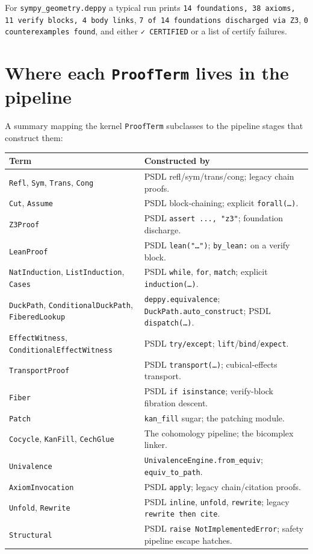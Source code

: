 For \texttt{sympy\_geometry.deppy} a typical run prints
\texttt{14 foundations, 38 axioms, 11 verify blocks, 4 body links},
\texttt{7 of 14 foundations discharged via Z3}, \texttt{0
counterexamples found}, and either \texttt{✓ CERTIFIED} or a list
of certify failures.

\section{Where each \texttt{ProofTerm} lives in the pipeline}

A summary mapping the kernel \texttt{ProofTerm} subclasses to the
pipeline stages that construct them:

\begin{center}
\begin{tabularx}{\linewidth}{@{}lX@{}}
\toprule
\textbf{Term} & \textbf{Constructed by} \\
\midrule
\texttt{Refl}, \texttt{Sym}, \texttt{Trans}, \texttt{Cong} &
PSDL refl/sym/trans/cong; legacy chain proofs. \\
\texttt{Cut}, \texttt{Assume} &
PSDL block-chaining; explicit \texttt{forall(\dots)}. \\
\texttt{Z3Proof} &
PSDL \texttt{assert ..., "z3"}; foundation discharge. \\
\texttt{LeanProof} &
PSDL \texttt{lean("\dots")}; \texttt{by\_lean:} on a verify block. \\
\texttt{NatInduction}, \texttt{ListInduction}, \texttt{Cases} &
PSDL \texttt{while}, \texttt{for}, \texttt{match}; explicit
\texttt{induction(\dots)}. \\
\texttt{DuckPath}, \texttt{ConditionalDuckPath}, \texttt{FiberedLookup} &
\texttt{deppy.equivalence}; \texttt{DuckPath.auto\_construct};
PSDL \texttt{dispatch(\dots)}. \\
\texttt{EffectWitness}, \texttt{ConditionalEffectWitness} &
PSDL \texttt{try/except}; \texttt{lift}/\texttt{bind}/\texttt{expect}. \\
\texttt{TransportProof} &
PSDL \texttt{transport(\dots)}; cubical-effects transport. \\
\texttt{Fiber} &
PSDL \texttt{if isinstance}; verify-block fibration descent. \\
\texttt{Patch} &
\texttt{kan\_fill} sugar; the patching module. \\
\texttt{Cocycle}, \texttt{KanFill}, \texttt{CechGlue} &
The cohomology pipeline; the bicomplex linker. \\
\texttt{Univalence} &
\texttt{UnivalenceEngine.from\_equiv}; \texttt{equiv\_to\_path}. \\
\texttt{AxiomInvocation} &
PSDL \texttt{apply}; legacy chain/citation proofs. \\
\texttt{Unfold}, \texttt{Rewrite} &
PSDL \texttt{inline}, \texttt{unfold}, \texttt{rewrite}; legacy
\texttt{rewrite then cite}. \\
\texttt{Structural} &
PSDL \texttt{raise NotImplementedError}; safety pipeline
escape hatches. \\
\bottomrule
\end{tabularx}
\end{center}

